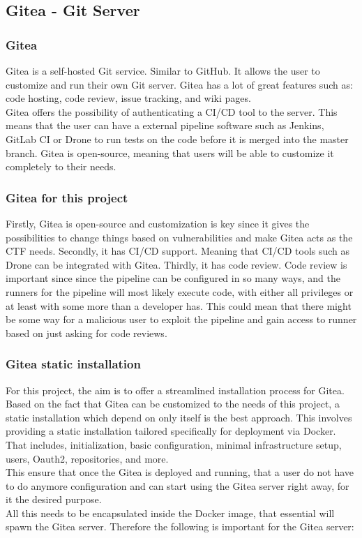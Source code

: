 \subsection{Gitea - Git Server}
\label{sec:gitea}
\subsubsection{Gitea}

Gitea\cite{giteadocs} is a self-hosted \ac{Git}\cite{git} service. Similar to GitHub\cite{GitHub}. 
It allows the user to customize and run 
their own Git server. Gitea has a lot of great features such as: code hosting, code review, issue tracking, and wiki pages.\\
Gitea offers the possibility of authenticating a \ac{CI/CD} tool to the server. This means that the user
can have a external pipeline software such as Jenkins\cite{jenkinsio}, GitLab CI\cite{gitlab} or Drone\cite{droneio} to run tests on the code before it is
merged into the master branch.
Gitea is open-source, meaning that users will be able to customize it completely to their needs.

\subsubsection{Gitea for this project}
Firstly, Gitea is open-source and customization is key since it gives the possibilities to change things based on vulnerabilities and 
make Gitea acts as the CTF needs.
Secondly, it has \ac{CI/CD} support. Meaning that \ac{CI/CD} tools such as Drone can be integrated with Gitea.
Thirdly, it has code review. Code review is important since 
since the pipeline can be configured in so many ways, and the runners for the pipeline will most likely execute code, 
with either all privileges or at least with some more than a developer has. This could mean that there might be some way 
for a malicious user to exploit the pipeline and gain access to runner based on just asking for code reviews.
\subsubsection{Gitea static installation}
For this project, the aim is to offer a streamlined 
installation process for Gitea.
Based on the fact that Gitea can be customized to the needs of this project,
a static installation which depend on only itself is the best approach.
This involves providing a static installation 
tailored specifically for deployment via Docker.
That includes, initialization, basic configuration, minimal infrastructure setup, users, Oauth2, repositories, and more.\\
This ensure that once the Gitea is deployed and running, that a user 
do not have to do anymore configuration and can start using the Gitea server right away, for it the desired purpose.\\
All this needs to be encapsulated inside the Docker image, that essential will spawn the Gitea server.
Therefore the following is important for the Gitea server: 

